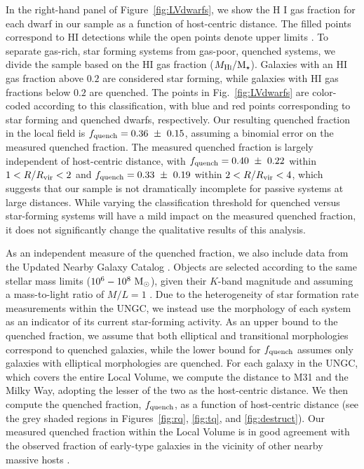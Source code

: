 



In the right-hand panel of Figure~\ref{fig:LVdwarfs}, we show the H{\scriptsize
  I} gas fraction for each dwarf in our sample as a function of host-centric
distance. The filled points correspond to H{\scriptsize I} detections while the
open points denote upper limits \citep{hunter12, spekkens14, mcconnachie12}.
%
To separate gas-rich, star forming systems from gas-poor, quenched systems, we
divide the sample based on the H{\scriptsize I} gas fraction
($M_{\rm H\protect\scalebox{0.55}{\rm I}}/\mstar$). Galaxies with an
H{\scriptsize I} gas fraction above $0.2$ are considered star forming, while
galaxies with H{\scriptsize I} gas fractions below $0.2$ are quenched. The
points in Fig.~\ref{fig:LVdwarfs} are color-coded according to this
classification, with blue and red points corresponding to star forming and
quenched dwarfs, respectively.
%
Our resulting quenched fraction in the local field is
$f_{\rm quench} = 0.36~\pm~0.15$, assuming a binomial error on the measured
quenched fraction.
%
The measured quenched fraction is largely independent of host-centric distance,
with $f_{\rm quench} = 0.40~\pm~0.22$ within $1 < R/R_{\rm{vir}} < 2$ and
$f_{\rm quench} = 0.33~\pm~0.19$ within $2 < R/R_{\rm{vir}} < 4$, which suggests that
our sample is not dramatically incomplete for passive systems at large
distances.
%
While varying the classification threshold for quenched versus star-forming
systems will have a mild impact on the measured quenched fraction, it does not
significantly change the qualitative results of this analysis.



As an independent measure of the quenched fraction, we also include
data from the Updated Nearby Galaxy Catalog
\citep[UNGC,][]{karachentsev13a}.
%
Objects are selected according to the same stellar mass limits
($10^{6}-10^{8}~{\rm M}_{\odot}$), given their $K$-band magnitude and assuming a
mass-to-light ratio of $M/L = 1$ \citep{bell01}.
%
Due to the heterogeneity of star formation rate measurements within the UNGC, we
instead use the morphology of each system as an indicator of its current
star-forming activity. As an upper bound to the quenched fraction, we assume
that both elliptical and transitional morphologies correspond to quenched
galaxies, while the lower bound for $f_{\rm quench}$ assumes only galaxies with
elliptical morphologies are quenched.
%
For each galaxy in the UNGC, which covers the entire Local Volume, we compute
the distance to M31 and the Milky Way, adopting the lesser of the two as the
host-centric distance.
%
We then compute the quenched fraction, $f_{\rm quench}$, as a function of
host-centric distance (see the grey shaded regions in Figures~\ref{fig:rq},
\ref{fig:tq}, and \ref{fig:destruct}).
%
Our measured quenched fraction within the Local Volume is in good
  agreement with the observed fraction of early-type galaxies in the vicinity of
  other nearby massive hosts \citep{karachentsev15c}.





